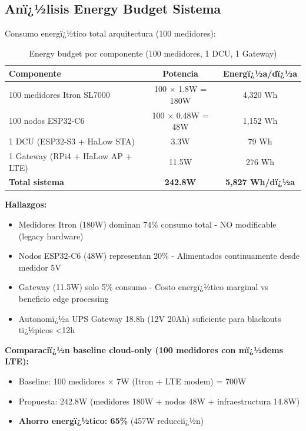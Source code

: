 \subsection{Anï¿½lisis Energy Budget Sistema}

Consumo energï¿½tico total arquitectura (100 medidores):

\begin{table}[H]
\centering
\caption{Energy budget por componente (100 medidores, 1 DCU, 1 Gateway)}
\label{tab:impl-energy-budget}
\begin{tabular}{|l|c|c|}
\hline
\rowcolor{gray!20}
\textbf{Componente} & \textbf{Potencia} & \textbf{Energï¿½a/dï¿½a} \\
\hline
100 medidores Itron SL7000 & 100 $\times$ 1.8W = 180W & 4,320 Wh \\
\hline
100 nodos ESP32-C6 & 100 $\times$ 0.48W = 48W & 1,152 Wh \\
\hline
1 DCU (ESP32-S3 + HaLow STA) & 3.3W & 79 Wh \\
\hline
1 Gateway (RPi4 + HaLow AP + LTE) & 11.5W & 276 Wh \\
\hline
\rowcolor{yellow!20}
\textbf{Total sistema} & \textbf{242.8W} & \textbf{5,827 Wh/dï¿½a} \\
\hline
\end{tabular}
\end{table}

\textbf{Hallazgos:}

\begin{itemize}
    \item Medidores Itron (180W) dominan 74\% consumo total - NO modificable (legacy hardware)
    \item Nodos ESP32-C6 (48W) representan 20\% - Alimentados continuamente desde medidor 5V
    \item Gateway (11.5W) solo 5\% consumo - Costo energï¿½tico marginal vs beneficio edge processing
    \item Autonomï¿½a UPS Gateway 18.8h (12V 20Ah) suficiente para blackouts tï¿½picos <12h
\end{itemize}

\textbf{Comparaciï¿½n baseline cloud-only (100 medidores con mï¿½dems LTE):}

\begin{itemize}
    \item Baseline: 100 medidores $\times$ 7W (Itron + LTE modem) = 700W
    \item Propuesta: 242.8W (medidores 180W + nodos 48W + infraestructura 14.8W)
    \item \textbf{Ahorro energï¿½tico: 65\%} (457W reducciï¿½n)
\end{itemize}

